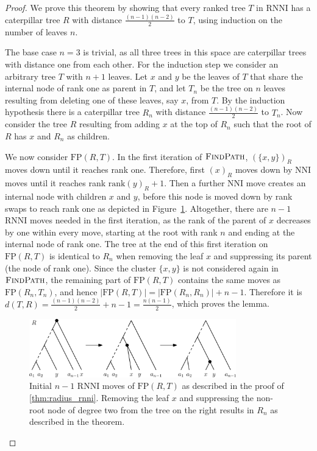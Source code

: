\documentclass[11pt]{amsart}
\newcommand{\rnni}{\mathrm{RNNI}}
\newcommand{\findpath}{\textsc{FindPath}}
\newcommand{\rank}{\mathrm{rank}}
\newcommand{\nni}{\mathrm{NNI}}
\newcommand{\fp}{\mathrm{FP}}
\begin{document}
\begin{proof}
	We prove this theorem by showing that every ranked tree $T$ in $\rnni$ has a caterpillar tree $R$ with distance $\frac{(n-1)(n-2)}{2}$ to $T$, using induction on the number of leaves $n$.

	The base case $n=3$ is trivial, as all three trees in this space are caterpillar trees with distance one from each other.
	For the induction step we consider an arbitrary tree $T$ with $n+1$ leaves.
	Let $x$ and $y$ be the leaves of $T$ that share the internal node of rank one as parent in $T$, and let $T_n$ be the tree on $n$ leaves resulting from deleting one of these leaves, say $x$, from $T$.
	By the induction hypothesis there is a caterpillar tree $R_n$ with distance $\frac{(n-1)(n-2)}{2}$ to $T_n$.
	Now consider the tree $R$ resulting from adding $x$ at the top of $R_n$ such that the root of $R$ has $x$ and $R_n$ as children.

	We now consider $\fp(R,T)$.
	In the first iteration of $\findpath$, $(\{x,y\})_R$ moves down until it reaches rank one.
	Therefore, first $(x)_R$ moves down by $\nni$ moves until it reaches rank $\rank(y)_R + 1$.
	Then a further $\nni$ move creates an internal node with children $x$ and $y$, before this node is moved down by rank swaps to reach rank one as depicted in Figure~\ref{fig:max_dist_ctree}.
	Altogether, there are $n-1$ $\rnni$ moves needed in the first iteration, as the rank of the parent of $x$ decreases by one within every move, starting at the root with rank $n$ and ending at the internal node of rank one.
	The tree at the end of this first iteration on $\fp(R,T)$ is identical to $R_n$ when removing the leaf $x$ and suppressing its parent (the node of rank one).
	Since the cluster $\{x,y\}$ is not considered again in $\findpath$, the remaining part of $\fp(R,T)$ contains the same moves as $\fp(R_n,T_n)$, and hence $|\fp(R,T)| = |\fp(R_n,R_n)| + n-1$.
	Therefore it is $d(T,R) = \frac{(n-1)(n-2)}{2} + n-1 = \frac{n(n-1)}{2}$, which proves the lemma.
	\begin{figure}[ht]
		\includegraphics[width=0.8\textwidth]{max_dist_ctree.eps}
		\caption{Initial $n - 1$ $\rnni$ moves of $\fp(R,T)$ as described in the proof of \autoref{thm:radius_rnni}.
		Removing the leaf $x$ and suppressing the non-root node of degree two from the tree on the right results in $R_n$ as described in the theorem.}
		\label{fig:max_dist_ctree}
	\end{figure}
\end{proof}
\end{document}
